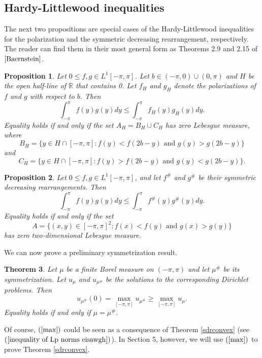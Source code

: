 \documentclass[11pt]{amsart}
\newtheorem{theorem}{Theorem}[section]
\newtheorem{proposition}[theorem]{Proposition}
\numberwithin{equation}{section}
\begin{document}
\subsection{Hardy-Littlewood inequalities}
The next two propositions are special cases of the Hardy-Littlewood inequalities for the polarization and the symmetric decreasing rearrangement, respectively. The reader can find them in their most general form as Theorems 2.9 and 2.15 of \(\cite{Baernstein}\).
\begin{proposition}\label{hardy polar}
Let \(0\leq f,g\in L^1[-\pi,\pi]\). Let \(b\in(-\pi,0)\cup(0,\pi)\) and \(H\) be the open half-line of \(\mathbb{R}\) that contains 0. Let \(f_H\) and \(g_H\) denote the polarizations of \(f\) and \(g\) with respect to \(b\). Then
\[\int_{-\pi}^\pi f(y)g(y)dy\leq\int_{-\pi}^\pi f_H(y)g_H(y)dy.\]
Equality holds if and only if the set \(A_H=B_H\cup C_H\) has zero Lebesgue measure, where
\[B_H=\{y\in H\cap[-\pi,\pi]:f(y)<f(2b-y)\text{ and }g(y)>g(2b-y)\}\]
and
\[C_H=\{y\in H\cap[-\pi,\pi]:f(y)>f(2b-y)\text{ and }g(y)<g(2b-y)\}.\]
\end{proposition}
\begin{proposition}\label{hardy sdr}
Let \(0\leq f,g\in L^1[-\pi,\pi]\), and let \(f^\#\) and \(g^\#\) be their symmetric decreasing rearrangements. Then
\[\int_{-\pi}^\pi f(y)g(y)dy\leq\int_{-\pi}^\pi f^\#(y)g^\#(y)dy.\]
Equality holds if and only if the set
\[A=\bigl\{(x,y)\in[-\pi,\pi]^2:f(x)<f(y)\text{ and }g(x)>g(y)\bigr\}\]
has zero two-dimensional Lebesgue measure.
\end{proposition}
We can now prove a preliminary symmetrization result.
\begin{theorem}\label{theorem max}
Let \(\mu\) be a finite Borel measure on \((-\pi,\pi)\) and let \(\mu^\#\) be its symmetrization. Let \(u_\mu\) and \(u_{\mu^\#}\) be the solutions to the corresponding Dirichlet problems. Then
\begin{equation}\label{max}u_{\mu^\#}(0)=\max_{[-\pi,\pi]} u_{\mu^\#}\geq \max _{[-\pi,\pi]}u_\mu.\end{equation}
Equality holds if and only if \(\mu=\mu^\#\).
\end{theorem}
Of course, \((\ref{max})\) could be seen as a consequence of Theorem \ref{sdrconvex} (see \((\ref{inequality of Lp norms eisawgh})\)). In Section 5, however, we will use \((\ref{max})\) to prove Theorem \ref{sdrconvex}.
\end{document}
